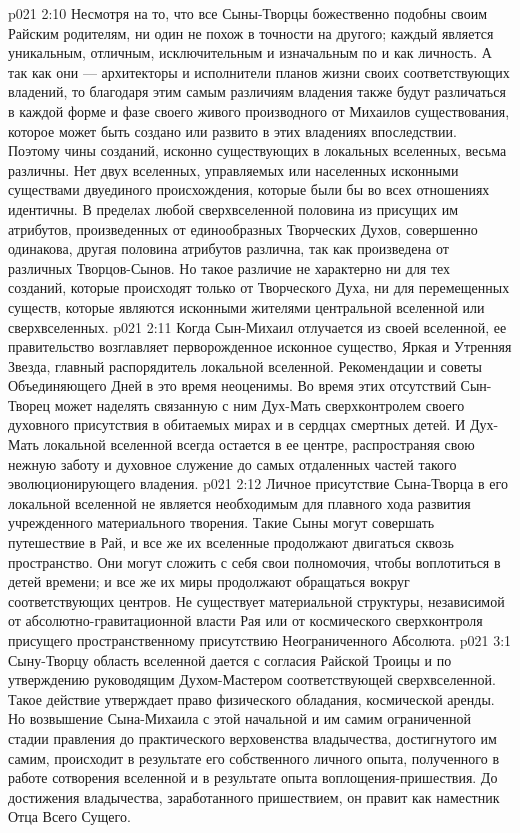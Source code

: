 \vs p021 2:10 Несмотря на то, что все Сыны\hyp{}Творцы божественно подобны своим Райским родителям, ни один не похож в точности на другого; каждый является уникальным, отличным, исключительным и изначальным по  и как личность. А так как они --- архитекторы и исполнители планов жизни своих соответствующих владений, то благодаря этим самым различиям владения также будут различаться в каждой форме и фазе своего живого производного от Михаилов существования, которое может быть создано или развито в этих владениях впоследствии. Поэтому чины созданий, исконно существующих в локальных вселенных, весьма различны. Нет двух вселенных, управляемых или населенных исконными существами двуединого происхождения, которые были бы во всех отношениях идентичны. В пределах любой сверхвселенной половина из присущих им атрибутов, произведенных от единообразных Творческих Духов, совершенно одинакова, другая половина атрибутов различна, так как произведена от различных Творцов\hyp{}Сынов. Но такое различие не характерно ни для тех созданий, которые происходят только от Творческого Духа, ни для перемещенных существ, которые являются исконными жителями центральной вселенной или сверхвселенных.
\vs p021 2:11 \pc Когда Сын\hyp{}Михаил отлучается из своей вселенной, ее правительство возглавляет перворожденное исконное существо, Яркая и Утренняя Звезда, главный распорядитель локальной вселенной. Рекомендации и советы Объединяющего Дней в это время неоценимы. Во время этих отсутствий Сын\hyp{}Творец может наделять связанную с ним Дух\hyp{}Мать сверхконтролем своего духовного присутствия в обитаемых мирах и в сердцах смертных детей. И Дух\hyp{}Мать локальной вселенной всегда остается в ее центре, распространяя свою нежную заботу и духовное служение до самых отдаленных частей такого эволюционирующего владения.
\vs p021 2:12 Личное присутствие Сына\hyp{}Творца в его локальной вселенной не является необходимым для плавного хода развития учрежденного материального творения. Такие Сыны могут совершать путешествие в Рай, и все же их вселенные продолжают двигаться сквозь пространство. Они могут сложить с себя свои полномочия, чтобы воплотиться в детей времени; и все же их миры продолжают обращаться вокруг соответствующих центров. Не существует материальной структуры, независимой от абсолютно\hyp{}гравитационной власти Рая или от космического сверхконтроля присущего пространственному присутствию Неограниченного Абсолюта.
\vs p021 3:1 Сыну\hyp{}Творцу область вселенной дается с согласия Райской Троицы и по утверждению руководящим Духом\hyp{}Мастером соответствующей сверхвселенной. Такое действие утверждает право физического обладания, космической аренды. Но возвышение Сына\hyp{}Михаила с этой начальной и им самим ограниченной стадии правления до практического верховенства владычества, достигнутого им самим, происходит в результате его собственного личного опыта, полученного в работе сотворения вселенной и в результате опыта воплощения\hyp{}пришествия. До достижения владычества, заработанного пришествием, он правит как наместник Отца Всего Сущего.
